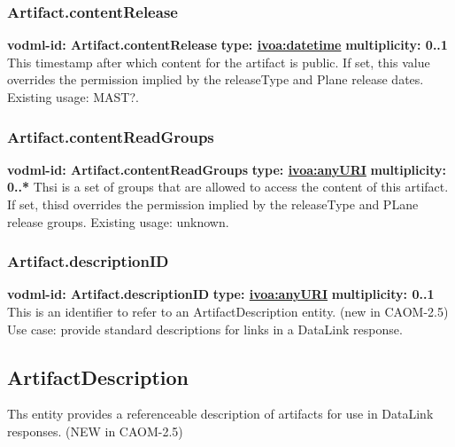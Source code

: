    \subsubsection{Artifact.contentRelease}
      \textbf{vodml-id: Artifact.contentRelease} \newline
      \textbf{type: \hyperref[sect:ivoa]{ivoa:datetime}} \newline
      \textbf{multiplicity: 0..1} \newline
      This timestamp after which content for the artifact is public. If set, this value overrides the permission implied by the releaseType and Plane release dates. Existing usage: MAST?.

    \subsubsection{Artifact.contentReadGroups}
      \textbf{vodml-id: Artifact.contentReadGroups} \newline
      \textbf{type: \hyperref[sect:ivoa]{ivoa:anyURI}} \newline
      \textbf{multiplicity: 0..*} \newline
      Thsi is a set of groups that are allowed to access the content of this artifact. If set, thisd overrides the permission implied by the releaseType and PLane release groups. Existing usage: unknown.

    \subsubsection{Artifact.descriptionID}
      \textbf{vodml-id: Artifact.descriptionID} \newline
      \textbf{type: \hyperref[sect:ivoa]{ivoa:anyURI}} \newline
      \textbf{multiplicity: 0..1} \newline
      This is an identifier to refer to an ArtifactDescription entity. (new in CAOM-2.5) Use case: provide standard descriptions for links in a DataLink response.

  \subsection{ArtifactDescription}
  \label{sect:ArtifactDescription}
    Ths entity provides a referenceable description of artifacts for use in DataLink responses. (NEW in CAOM-2.5)

